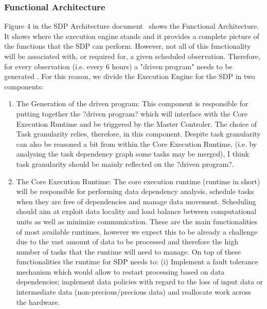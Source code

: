\documentclass[11pt,a4paper]{article}
\begin{document}
\subsubsection{Functional Architecture}
Figure 4 in the SDP Architecture document~\cite{SDParch} shows the Functional Architecture. It shows where the execution engine stands and it provides a complete picture of the functions that the SDP can perform. However, not all of this functionality will be associated with, or required for, a given scheduled observation. Therefore, for every observation (i.e. every 6 hours) a "driven program" needs to be generated
. For this reason, we divide the Execution Engine for the SDP in two components:
\begin{enumerate}
\item The Generation of the driven program: This component is responsible for putting together the ?driven program? which will interface with the Core Execution Runtime and  be triggered by the Master Controler. The choice of Task granularity relies, therefore, in this component. Despite task granularity can also be reasoned a bit from within the Core Execution Runtime, (i.e. by analysing the task dependency graph some tasks may be merged), I think task granularity should be mainly reflected on the ?driven program?. 
\item The Core Execution Runtime:  The core execution runtime (runtime in short) will be responsible for performing data dependency analysis, schedule tasks when they are free of dependencies and manage data movement. Scheduling should aim at exploit data locality and load balance between computational units as well as minimize communication. These are the main functionalities of most available runtimes, however we expect this to be already a challenge due to the vast amount of data to be processed and therefore the high number of tasks that the runtime will need to manage. On top of these functionalities the runtime for SDP needs to: (i) Implement a fault tolerance mechanism which would allow to restart processing based on data dependencies; implement data policies with regard to the loss of input data or intermediate data (non-precious/precious data) and reallocate work across the hardware. 
\end{enumerate}
\end{document}
